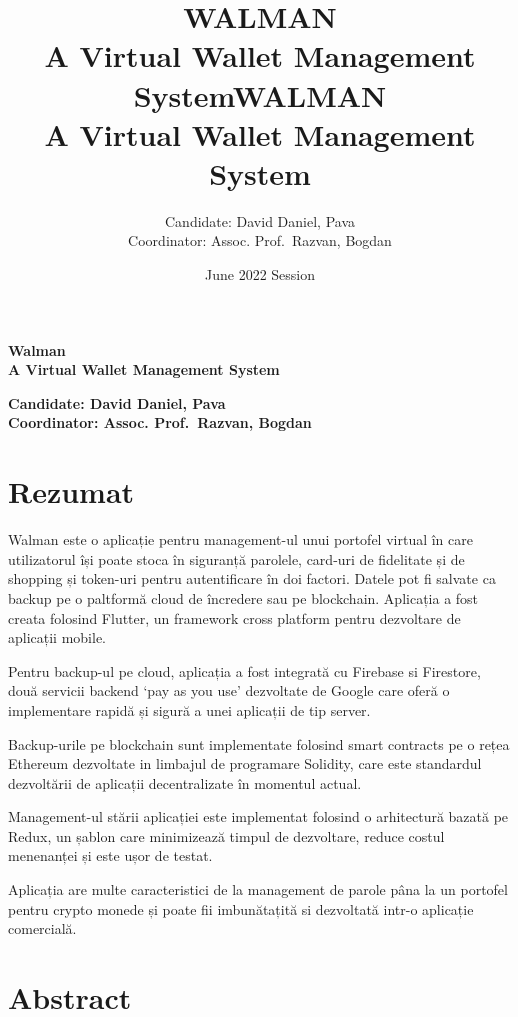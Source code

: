 \documentclass[a4paper,12pt]{report}
\title{\LARGE WALMAN\\{ A Virtual Wallet Management System}}
\title{\LARGE WALMAN\\{ A Virtual Wallet Management System}}
\author{Candidate: David Daniel, Pava
    \\Coordinator: Assoc. Prof.\ Razvan, Bogdan}
\date{June 2022 Session}
\begin{document}
\begin{titlepage}
    \thispagestyle{titlepage}
    \begin{center}
        \vspace*{10cm}
        \LARGE\textbf{Walman\\A Virtual Wallet Management System}\\
        \vfill
    \end{center}
    \begin{flushleft}
        \large\textbf{Candidate: David Daniel, Pava
            \\Coordinator: Assoc. Prof.\ Razvan, Bogdan}
    \end{flushleft}

\end{titlepage}

\chapter*{Rezumat}

\bigskip
\bigskip
\bigskip

Walman este o aplicație pentru management-ul unui portofel virtual în care
utilizatorul își poate stoca în siguranță parolele, card-uri de fidelitate și
de shopping și token-uri pentru autentificare în doi factori. Datele pot fi
salvate ca backup pe o paltformă cloud de încredere sau pe blockchain.
Aplicația a fost creata folosind Flutter, un framework cross platform pentru
dezvoltare de aplicații mobile.

Pentru backup-ul pe cloud, aplicația a fost integrată cu Firebase si Firestore,
două servicii backend `pay as you use' dezvoltate de Google care oferă o
implementare rapidă și sigură a unei aplicații de tip server.

Backup-urile pe blockchain sunt implementate folosind smart contracts pe o
rețea Ethereum dezvoltate in limbajul de programare Solidity, care este
standardul dezvoltării de aplicații decentralizate în momentul actual.

Management-ul stării aplicației este implementat folosind o arhitectură bazată
pe Redux, un șablon care minimizează timpul de dezvoltare, reduce costul
menenanței și este ușor de testat.

Aplicația are multe caracteristici de la management de parole pâna la un
portofel pentru crypto monede și poate fii imbunătațită si dezvoltată intr-o
aplicație comercială.

\chapter*{Abstract}
\end{document}
